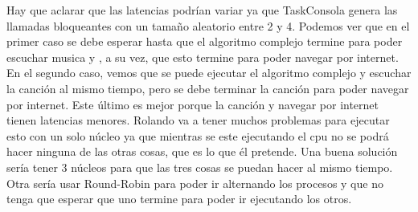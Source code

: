 Hay que aclarar que las latencias podrían variar ya que TaskConsola genera las llamadas bloqueantes con un tamaño aleatorio entre 2 y 4. Podemos ver que en el primer caso se
debe esperar hasta que el algoritmo complejo termine para poder escuchar musica y , a su vez, que esto termine para poder navegar por internet. En el segundo caso, vemos que 
se puede ejecutar el algoritmo complejo y escuchar la canción al mismo tiempo, pero se debe terminar la canción para poder navegar por internet. Este último es mejor porque
la canción y navegar por internet tienen latencias menores. Rolando va a tener muchos problemas para ejecutar esto con un solo núcleo ya que mientras se este ejecutando el cpu no se podrá hacer ninguna de las otras cosas, que es lo que él
pretende. Una buena solución sería tener 3 núcleos para que las tres cosas se puedan hacer al mismo tiempo. Otra sería usar Round-Robin para poder ir alternando los procesos y 
que no tenga que esperar que uno termine para poder ir ejecutando los otros.